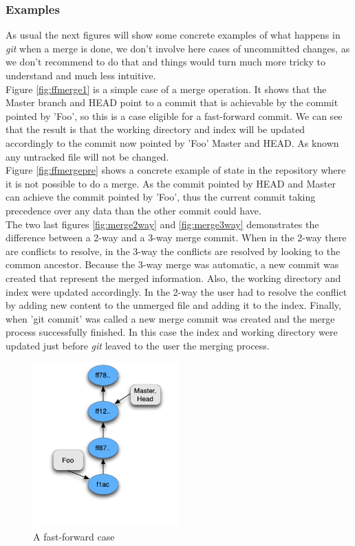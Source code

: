 \subsubsection{Examples}

As usual the next figures will show some concrete examples of what happens
in \emph{git} when a merge is done, we don't involve here cases of 
uncommitted changes, as we don't recommend to do that and 
things would turn much more tricky to understand and much less intuitive. \\

Figure \ref{fig:ffmerge1} is a simple case of a merge operation. It shows
that the Master branch and HEAD point to a commit that is achievable by the
commit pointed by 'Foo', so this is a case eligible for a fast-forward commit.
We can see that the result is that the working directory and index will be
updated accordingly to the commit now pointed by 'Foo' Master and HEAD. As
known any untracked file will not be changed. \\

Figure \ref{fig:ffmergepre} shows a concrete example of state in the repository
where it is not possible to do a merge. As the commit pointed by HEAD and Master
can achieve the commit pointed by 'Foo', thus the current commit taking
precedence over any data than the other commit could have. \\

The two last figures \ref{fig:merge2way} and \ref{fig:merge3way} demonstrates 
the difference between a 2-way and a 3-way merge commit. When in the 2-way there
are conflicts to resolve, in the 3-way the conflicts are resolved by looking to
the common ancestor. Because the 3-way merge was automatic, a new commit was
created that represent the merged information. Also, the working directory and
index were updated accordingly. In the 2-way the user had to resolve the
conflict by adding new content to the unmerged file and adding it to the index.
Finally, when 'git commit' was called a new merge commit was created and 
the merge process successfully finished. In this case the index and working 
directory were updated just before \emph{git} leaved to the user the merging
process. \\

\begin{figure}[!t]
   \centering
   \includegraphics[width=0.5\textwidth]{images/fast_forward.png}
   \caption{A fast-forward case}\label{fig:fast_forward}
\end{figure}

